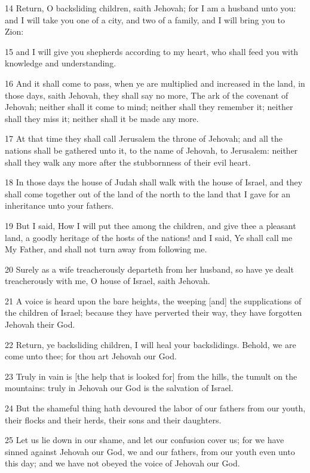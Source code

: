 \par 14 Return, O backsliding children, saith Jehovah; for I am a husband unto you: and I will take you one of a city, and two of a family, and I will bring you to Zion:
\par 15 and I will give you shepherds according to my heart, who shall feed you with knowledge and understanding.
\par 16 And it shall come to pass, when ye are multiplied and increased in the land, in those days, saith Jehovah, they shall say no more, The ark of the covenant of Jehovah; neither shall it come to mind; neither shall they remember it; neither shall they miss it; neither shall it be made any more.
\par 17 At that time they shall call Jerusalem the throne of Jehovah; and all the nations shall be gathered unto it, to the name of Jehovah, to Jerusalem: neither shall they walk any more after the stubbornness of their evil heart.
\par 18 In those days the house of Judah shall walk with the house of Israel, and they shall come together out of the land of the north to the land that I gave for an inheritance unto your fathers.
\par 19 But I said, How I will put thee among the children, and give thee a pleasant land, a goodly heritage of the hosts of the nations! and I said, Ye shall call me My Father, and shall not turn away from following me.
\par 20 Surely as a wife treacherously departeth from her husband, so have ye dealt treacherously with me, O house of Israel, saith Jehovah.
\par 21 A voice is heard upon the bare heights, the weeping [and] the supplications of the children of Israel; because they have perverted their way, they have forgotten Jehovah their God.
\par 22 Return, ye backsliding children, I will heal your backslidings. Behold, we are come unto thee; for thou art Jehovah our God.
\par 23 Truly in vain is [the help that is looked for] from the hills, the tumult on the mountains: truly in Jehovah our God is the salvation of Israel.
\par 24 But the shameful thing hath devoured the labor of our fathers from our youth, their flocks and their herds, their sons and their daughters.
\par 25 Let us lie down in our shame, and let our confusion cover us; for we have sinned against Jehovah our God, we and our fathers, from our youth even unto this day; and we have not obeyed the voice of Jehovah our God.

